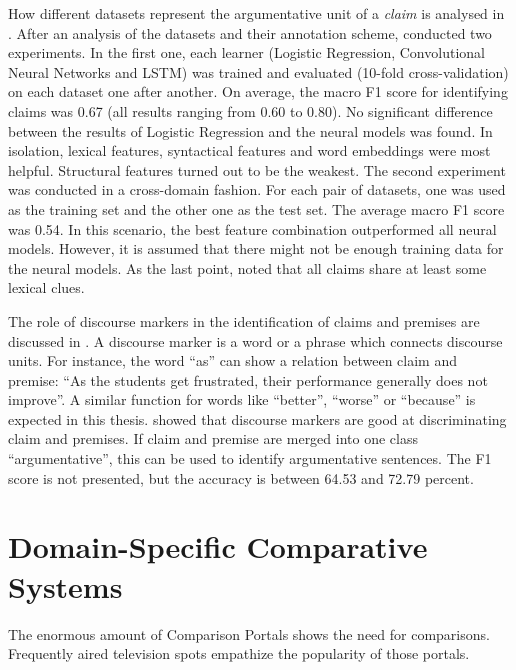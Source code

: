 How different datasets represent the argumentative unit of a \emph{claim} is analysed in \cite{Daxenberger2017What-is-the-Ess}. After an analysis of the datasets and their annotation scheme, \cite{Daxenberger2017What-is-the-Ess} conducted two experiments.
In the first one, each learner (Logistic Regression, Convolutional Neural Networks and LSTM) was trained and evaluated (10-fold cross-validation) on each dataset one after another. On average, the macro F1 score for identifying claims was 0.67 (all results ranging from 0.60 to 0.80). No significant difference between the results of Logistic Regression and the neural models was found. In isolation, lexical features, syntactical features and word embeddings were most helpful. Structural features turned out to be the weakest.
The second experiment was conducted in a cross-domain fashion. For each pair of datasets, one was used as the training set and the other one as the test set. The average macro F1 score was 0.54. In this scenario, the best feature combination outperformed all neural models. However, it is assumed that there might not be enough training data for the neural models.
As the last point, \cite{Daxenberger2017What-is-the-Ess} noted that all claims share at least some lexical clues.


The role of discourse markers in the identification of claims and premises are discussed in \cite{Eckle-Kohler2015On-the-Role-of-}. A discourse marker is a word or a phrase which connects discourse units. For instance, the word \enquote{as} can show a relation between claim and premise: \enquote{As the students get frustrated, their performance generally does not improve}.  A similar function for words like \enquote{better}, \enquote{worse} or \enquote{because} is expected in this thesis. \cite{Eckle-Kohler2015On-the-Role-of-} showed that discourse markers are good at discriminating claim and premises. If claim and premise are merged into one class \enquote{argumentative}, this can be used to identify argumentative sentences. The F1 score is not presented, but the accuracy is between 64.53 and 72.79 percent.



\section{Domain-Specific Comparative Systems}
The enormous amount of Comparison Portals shows the need for comparisons. Frequently aired television spots empathize the popularity of those portals.

